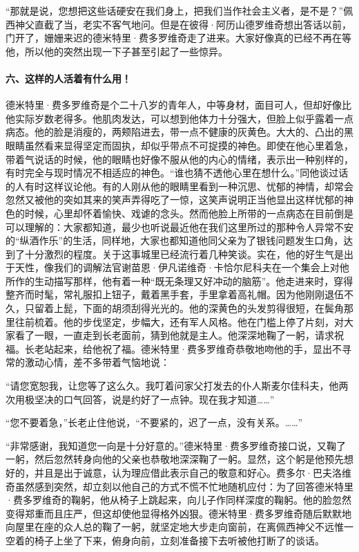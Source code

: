 \par “那就是说，您想把这些话硬安在我们身上，把我们当作社会主义者，是不是？”佩西神父直截了当，老实不客气地问。但是在彼得·阿历山德罗维奇想出答话以前，门开了，姗姗来迟的德米特里·费多罗维奇走了进来。大家好像真的已经不再在等他，所以他的突然出现一下子甚至引起了一些惊异。
\paragraph*{六、这样的人活着有什么用！}
\par 德米特里·费多罗维奇是个二十八岁的青年人，中等身材，面目可人，但却好像比他实际岁数老得多。他肌肉发达，可以想到他体力十分强大，但脸上似乎露着一点病态。他的脸是消瘦的，两颊陷进去，带一点不健康的灰黄色。大大的、凸出的黑眼睛虽然看来显得坚定而固执，却似乎带点不可捉摸的神色。即使在他心里着急，带着气说话的时候，他的眼睛也好像不服从他的内心的情绪，表示出一种别样的，有时完全与现时情况不相适应的神色。“谁也猜不透他心里在想什么。”同他谈过话的人有时这样议论他。有的人刚从他的眼睛里看到一种沉思、忧郁的神情，却常会忽然又被他的突如其来的笑声弄得吃了一惊，这笑声说明正当他显出这样忧郁的神色的时候，心里却怀着愉快、戏谑的念头。然而他脸上所带的一点病态在目前倒是可以理解的：大家都知道，最少也听说最近他在我们这里所过的那种令人异常不安的“纵酒作乐”的生活，同样地，大家也都知道他同父亲为了银钱问题发生口角，达到了十分激烈的程度。关于这事城里已经流行着几种笑谈。实在，他的好生气是出于天性，像我们的调解法官谢苗恩·伊凡诺维奇·卡恰尔尼科夫在一个集会上对他所作的生动描写那样，他有着一种“既无条理又好冲动的脑筋”。他走进来时，穿得整齐而时髦，常礼服扣上钮子，戴着黑手套，手里拿着高礼帽。因为他刚刚退伍不久，只留着上髭，下面的胡须刮得光光的。他的深黄色的头发剪得很短，在鬓角那里往前梳着。他的步伐坚定，步幅大，还有军人风格。他在门槛上停了片刻，对大家看了一眼，一直走到长老面前，猜到他就是主人。他深深地鞠了一躬，请求祝福。长老站起来，给他祝了福。德米特里·费多罗维奇恭敬地吻他的手，显出不寻常的激动心情，差不多带着气恼地说：
\par “请您宽恕我，让您等了这么久。我叮着问家父打发去的仆人斯麦尔佳科夫，他两次用极坚决的口气回答，说是约好了一点钟。现在我才知道……”
\par “您不要着急，”长老止住他说，“不要紧的，迟了一点，没有关系。……”
\par “非常感谢，我知道您一向是十分好意的。”德米特里·费多罗维奇接口说，又鞠了一躬，然后忽然转身向他的父亲也恭敬地深深鞠了一躬。显然，这个躬是他预先想好的，并且是出于诚意，认为理应借此表示自己的敬意和好心。费多尔·巴夫洛维奇虽然感到突然，却立刻以他自己的方式不慌不忙地随机应付：为了回答德米特里·费多罗维奇的鞠躬，他从椅子上跳起来，向儿子作同样深度的鞠躬。他的脸忽然变得郑重而且庄严，但这却使他显得格外凶狠。德米特里·费多罗维奇随后默默地向屋里在座的众人总的鞠了一躬，就坚定地大步走向窗前，在离佩西神父不远惟一空着的椅子上坐了下来，俯身向前，立刻准备接下去听被他打断了的谈话。
